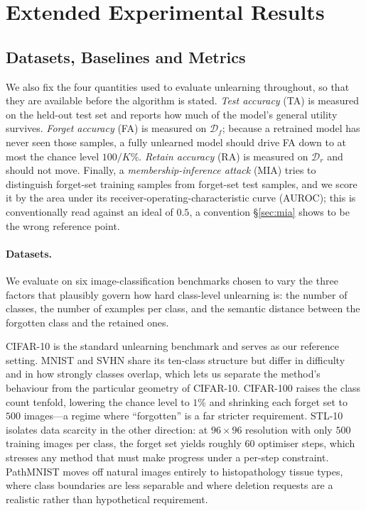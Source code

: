 \documentclass{article}
\newcommand{\Df}{\mathcal{D}_f}
\newcommand{\Dr}{\mathcal{D}_r}
\theoremstyle{remark}
\theoremstyle{plain}
\begin{document}
\section{Extended Experimental Results}\label{app:experiments}

\subsection{Datasets, Baselines and Metrics}

We also fix the four quantities used to evaluate unlearning throughout, so that
they are available before the algorithm is stated. \emph{Test accuracy} (TA) is
measured on the held-out test set and reports how much of the model's general
utility survives. \emph{Forget accuracy} (FA) is measured on $\Df$; because a
retrained model has never seen those samples, a fully unlearned model should
drive FA down to at most the chance level $100/K\%$. \emph{Retain accuracy} (RA)
is measured on $\Dr$ and should not move. Finally, a
\emph{membership-inference attack} (MIA) tries to distinguish forget-set
training samples from forget-set test samples, and we score it by the area under
its receiver-operating-characteristic curve (AUROC); this is conventionally read
against an ideal of $0.5$, a convention \S\ref{sec:mia} shows to be the wrong
reference point.

\paragraph{Datasets.}
We evaluate on six image-classification benchmarks chosen to vary the three
factors that plausibly govern how hard class-level unlearning is: the number of
classes, the number of examples per class, and the semantic distance between the
forgotten class and the retained ones.

CIFAR-10 \citep{krizhevsky2009cifar} is the standard unlearning benchmark and
serves as our reference setting. MNIST \citep{lecun1998mnist} and SVHN
\citep{netzer2011svhn} share its ten-class structure but differ in difficulty
and in how strongly classes overlap, which lets us separate the method's
behaviour from the particular geometry of CIFAR-10. CIFAR-100
\citep{krizhevsky2009cifar} raises the class count tenfold, lowering the chance
level to $1\%$ and shrinking each forget set to $500$ images---a regime where
``forgotten'' is a far stricter requirement. STL-10 \citep{coates2011stl10}
isolates data scarcity in the other direction: at $96{\times}96$ resolution with
only $500$ training images per class, the forget set yields roughly $60$
optimiser steps, which stresses any method that must make progress under a
per-step constraint. PathMNIST \citep{yang2023medmnist} moves off natural
images entirely to histopathology tissue types, where class boundaries are less
separable and where deletion requests are a realistic rather than hypothetical
requirement.
\end{document}
